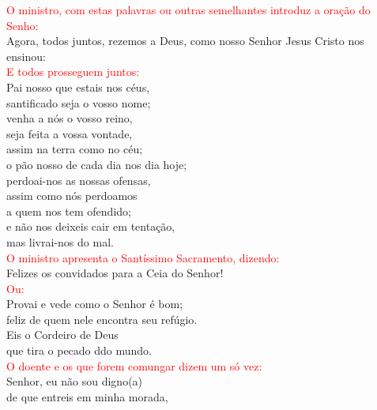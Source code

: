 \documentclass{book}
\begin{document}
\begin{flushleft}
    \textcolor{red}{O ministro, com estas palavras ou outras semelhantes introduz a oração do Senho:}
    \vspace{.1cm} \\
    Agora, todos juntos, rezemos a Deus, como nosso Senhor Jesus Cristo nos ensinou:
    \vspace{.1cm} \\
    \textcolor{red}{E todos prosseguem juntos:}
    \vspace{.1cm} \\
    Pai nosso que estais nos céus, \\
    santificado seja o vosso nome; \\
    venha a nós o vosso reino, \\
    seja feita a vossa vontade, \\
    assim na terra como no céu; \\
    o pão nosso de cada dia nos dia hoje; \\
    perdoai-nos as nossas ofensas, \\
    assim como nós perdoamos \\
    a quem nos tem ofendido; \\
    e não nos deixeis cair em tentação, \\
    mas livrai-nos do mal.
    \vspace{.1cm} \\
    \textcolor{red}{O ministro apresenta o Santíssimo Sacramento, dizendo:}
    \vspace{.1cm} \\
    Felizes os convidados para a Ceia do Senhor!
    \vspace{.1cm} \\
    \textcolor{red}{Ou:}
    \vspace{.1cm} \\
    Provai e vede como o Senhor é bom; \\
    feliz de quem nele encontra seu refúgio. \\
    Eis o Cordeiro de Deus \\
    que tira o pecado ddo mundo.
    \vspace{.1cm} \\
    \textcolor{red}{O doente e os que forem comungar dizem um só vez:}
    \vspace{.1cm} \\
    Senhor, eu não sou digno(a) \\
    de que entreis em minha morada, \\

\end{flushleft}
\end{document}
